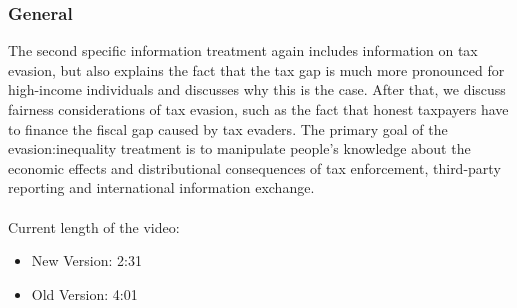 \documentclass[11pt]{article}
\begin{document}
\subsubsection*{General}
The second specific information treatment again includes information on tax evasion, but also explains the fact that the tax gap is much more pronounced for high-income individuals and discusses why this is the case. After that, we discuss fairness considerations of tax evasion, such as the fact that honest taxpayers have to finance the fiscal gap caused by tax evaders. The primary goal of the evasion:inequality treatment is to manipulate people’s knowledge about the economic effects and distributional consequences of tax enforcement, third-party reporting and international information exchange.
\\ \\
Current length of the video: 
\begin{itemize}
    \item New Version: 2:31
    \item Old Version: 4:01
\end{itemize}
\end{document}
